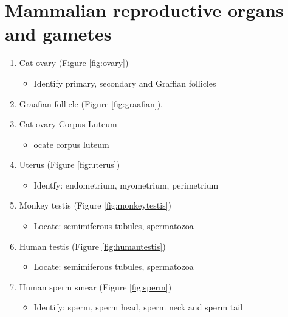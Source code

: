 \documentclass[]{book}
\providecommand{\tightlist}{%
  \setlength{\itemsep}{0pt}\setlength{\parskip}{0pt}}
\begin{document}
\hypertarget{mammalian-reproductive-organs-and-gametes}{%
\section{Mammalian reproductive organs and gametes}\label{mammalian-reproductive-organs-and-gametes}}

\begin{enumerate}
\def\labelenumi{\arabic{enumi}.}
\tightlist
\item
  Cat ovary (Figure \ref{fig:ovary})

  \begin{itemize}
  \tightlist
  \item
    Identify primary, secondary and Graffian follicles
  \end{itemize}
\item
  Graafian follicle (Figure \ref{fig:graafian}).
\item
  Cat ovary Corpus Luteum

  \begin{itemize}
  \tightlist
  \item
    ocate corpus luteum
  \end{itemize}
\item
  Uterus (Figure \ref{fig:uterus})

  \begin{itemize}
  \tightlist
  \item
    Identfy: endometrium, myometrium, perimetrium
  \end{itemize}
\item
  Monkey testis (Figure \ref{fig:monkeytestis})

  \begin{itemize}
  \tightlist
  \item
    Locate: semimiferous tubules, spermatozoa
  \end{itemize}
\item
  Human testis (Figure \ref{fig:humantestis})

  \begin{itemize}
  \tightlist
  \item
    Locate: semimiferous tubules, spermatozoa
  \end{itemize}
\item
  Human sperm smear (Figure \ref{fig:sperm})

  \begin{itemize}
  \tightlist
  \item
    Identify: sperm, sperm head, sperm neck and sperm tail
  \end{itemize}
\end{enumerate}
\end{document}
